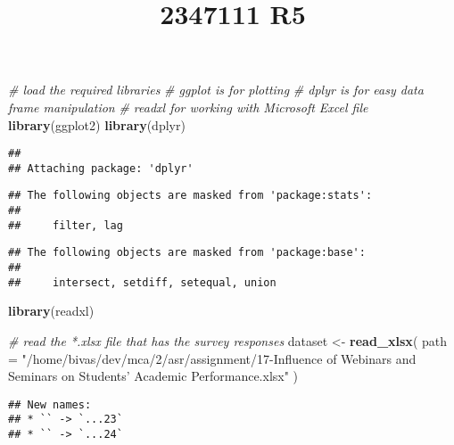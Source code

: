 \documentclass[
]{article}
\title{2347111 R5}
\author{}
\date{\vspace{-2.5em}}
\newenvironment{Shaded}{\begin{snugshade}}{\end{snugshade}}
\newcommand{\AttributeTok}[1]{\textcolor[rgb]{0.13,0.29,0.53}{#1}}
\newcommand{\CommentTok}[1]{\textcolor[rgb]{0.56,0.35,0.01}{\textit{#1}}}
\newcommand{\FunctionTok}[1]{\textcolor[rgb]{0.13,0.29,0.53}{\textbf{#1}}}
\newcommand{\NormalTok}[1]{#1}
\newcommand{\OtherTok}[1]{\textcolor[rgb]{0.56,0.35,0.01}{#1}}
\newcommand{\StringTok}[1]{\textcolor[rgb]{0.31,0.60,0.02}{#1}}
\begin{document}
\maketitle

\begin{Shaded}
\begin{Highlighting}[]
\CommentTok{\# load the required libraries}
\CommentTok{\# ggplot is for plotting}
\CommentTok{\# dplyr is for easy data frame manipulation}
\CommentTok{\# readxl for working with Microsoft Excel file}
\FunctionTok{library}\NormalTok{(ggplot2)}
\FunctionTok{library}\NormalTok{(dplyr)}
\end{Highlighting}
\end{Shaded}

\begin{verbatim}
## 
## Attaching package: 'dplyr'
\end{verbatim}

\begin{verbatim}
## The following objects are masked from 'package:stats':
## 
##     filter, lag
\end{verbatim}

\begin{verbatim}
## The following objects are masked from 'package:base':
## 
##     intersect, setdiff, setequal, union
\end{verbatim}

\begin{Shaded}
\begin{Highlighting}[]
\FunctionTok{library}\NormalTok{(readxl)}

\CommentTok{\# read the *.xlsx file that has the survey responses}
\NormalTok{dataset }\OtherTok{\textless{}{-}} \FunctionTok{read\_xlsx}\NormalTok{(}
    \AttributeTok{path =} \StringTok{"/home/bivas/dev/mca/2/asr/assignment/17{-}Influence of Webinars and Seminars on Students’ Academic Performance.xlsx"}
\NormalTok{)}
\end{Highlighting}
\end{Shaded}

\begin{verbatim}
## New names:
## * `` -> `...23`
## * `` -> `...24`
\end{verbatim}
\end{document}
